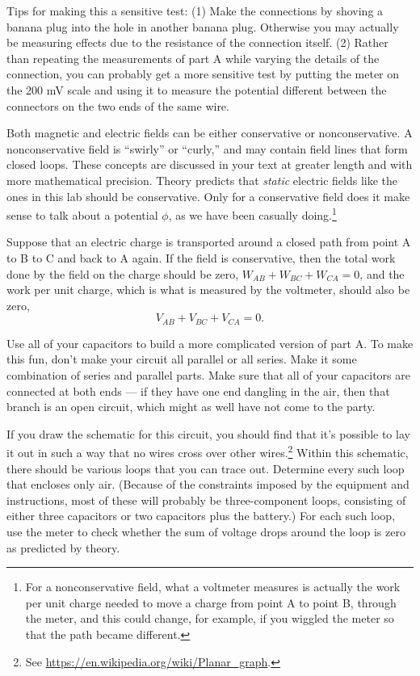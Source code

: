 Tips for making this a sensitive test: (1) Make the connections by shoving a banana plug into
the hole in another banana plug. Otherwise you may actually be measuring effects due to the
resistance of the connection itself. (2) Rather than repeating the measurements of
part A while varying the details of the connection, you can probably
get a more sensitive test by putting the meter on the 200 mV scale and using it to measure
the potential different between the connectors on the two ends of the same wire.


Both magnetic and electric fields can be either conservative or nonconservative.
A nonconservative field is ``swirly'' or ``curly,'' and may contain field lines
that form closed loops. These concepts are discussed in your text at greater length and
with more mathematical precision. Theory predicts that \emph{static} electric fields
like the ones in this lab should be conservative. Only for a conservative field does
it make sense to talk about a potential $\phi$, as we have been casually 
doing.\footnote{For a nonconservative field, what a voltmeter measures is actually the work
per unit charge needed to move a charge from point A to point B, through the meter, and this could
change, for example, if you wiggled the meter so that the path became different.}

Suppose that an electric charge is transported around a closed path from point A to B to C
and back to A again. If the field is conservative, then the total work done by the field
on the charge should be zero, $  W_{AB}+W_{BC}+W_{CA}=0$, and the work per unit charge,
which is what is measured by the voltmeter, should also be zero,
\begin{equation*}
  V_{AB}+V_{BC}+V_{CA}=0.
\end{equation*}

Use all of your capacitors to build a more complicated version of part A.
To make this fun, don't make your circuit all parallel or all series. Make it some
combination of series and parallel parts. Make sure that all of your capacitors are
connected at both ends --- if they have one end dangling in the air, then that branch
is an open circuit, which might as well have not come to the party.

If you draw the schematic for this circuit, you should find that it's possible to lay it
out in such a way that no wires cross over other wires.\footnote{See \url{https://en.wikipedia.org/wiki/Planar_graph}.}
Within this schematic, there should be various loops that you can trace out.
Determine every such loop that encloses only air. (Because of the constraints
imposed by the equipment and instructions, most of these will probably be
three-component loops, consisting of either three capacitors or two capacitors plus
the battery.) For each such loop, use the meter to check whether the sum of voltage
drops around the loop is zero as predicted by theory.




